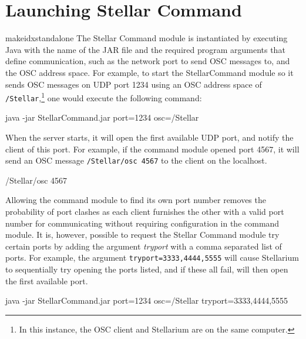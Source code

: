 \documentclass[10pt,a4paper,extrafontsizes]{memoir}
\begin{document}
\section{Launching Stellar Command}
makeidx{standalone}
The Stellar Command module is instantiated by executing Java  with the name of the JAR file and the required program arguments that define communication, such as the network port to send OSC messages to, and the OSC address space.  For example, to start the StellarCommand module so it sends OSC messages on UDP port 1234  using an OSC address space of \texttt{/Stellar},\footnote{In this instance, the OSC client and Stellarium are on the same computer.} one would execute the following command:\\

\begin{syntax}

	java -jar StellarCommand.jar port=1234 osc=/Stellar  \\

\end{syntax}
\bigskip
   When the server starts, it will open the first available UDP port, and notify the client of this port. For example, if the command module opened port 4567, it will send an OSC message \texttt{/Stellar/osc 4567} to the client on the localhost. 
   
\begin{syntax}

	/Stellar/osc 4567  \\

\end{syntax}
\bigskip

Allowing the command module to find its own port number removes the probability of port clashes as each client furnishes the other with a valid port number for communicating without requiring configuration in the command module. It is, however, possible to request the Stellar Command module try certain ports by adding the argument \textit{tryport}  with a comma separated list of ports. For example, the argument \texttt{tryport=3333,4444,5555} will cause Stellarium to sequentially try opening the ports listed, and if these all fail, will then open the first available port.\\
   
   \begin{syntax}

   	java -jar StellarCommand.jar port=1234 osc=/Stellar  tryport=3333,4444,5555\\

   \end{syntax}
   \bigskip
   
\end{document}
